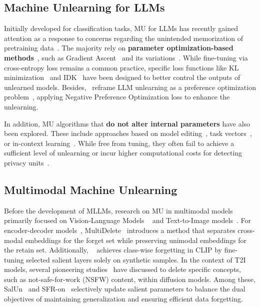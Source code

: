 \subsection{Machine Unlearning for LLMs}
Initially developed for classification tasks, MU for LLMs has recently gained attention as a response to concerns regarding the unintended memorization of pretraining data~\cite{si2023llmu_survey}. The majority rely on \textbf{parameter optimization-based methods}~\cite{nguyen2022mu_survey}, such as Gradient Ascent~\cite{thudi2022GA} and its variations~\cite{liu2022GA_Diff}. While fine-tuning via cross-entropy loss remains a common practice, specific loss functions like KL minimization~\cite{nguyen2020KL_Min,wang2023kga,liu2024revisiting} and IDK~\cite{maini2024tofu} have been designed to better control the outputs of unlearned models. Besides,~\citet{zhang2024npo} reframe LLM unlearning as a preference optimization problem~\cite{rafailov2024dpo}, applying Negative Preference Optimization loss to enhance the unlearning. \par 

In addition, MU algorithms that \textbf{do not alter internal parameters} have also been explored. These include approaches based on model editing~\cite{ilharco2022editing,wu2023depn}, task vectors~\cite{eldan2023whp,li2024wmdp}, or in-context learning~\cite{pawelczyk2023icun,thaker2024guardrail}. While free from tuning, they often fail to achieve a sufficient level of unlearning or incur higher computational costs for detecting privacy units~\cite{ilharco2022editing,wu2023depn}.


\subsection{Multimodal Machine Unlearning}\label{MMU}
Before the development of MLLMs, research on MU in multimodal models primarily focused on Vision-Language Models ~\cite{radford2021clip} and Text-to-Image models~\cite{rombach2022ldm}. For encoder-decoder models~\cite{li2021albef,li2022blip}, MultiDelete~\cite{cheng2024multidelete} introduces a method that separates cross-modal embeddings for the forget set while preserving unimodal embeddings for the retain set. Additionally, ~\citet{yang2024cliperase} achieves class-wise forgetting in CLIP by fine-tuning selected salient layers solely on synthetic samples. In the context of T2I models, several pioneering studies~\cite{Gandikota2023ErasingCF,Zhang2023ForgetMeNotLT} have discussed to delete specific concepts, such as not-safe-for-work (NSFW) content, within diffusion models. Among these, SalUn~\cite{Fan2023SalUnEM} and SFR-on~\cite{Huang2024UnifiedGM} selectively update salient parameters to balance the dual objectives of maintaining generalization and ensuring efficient data forgetting. 

